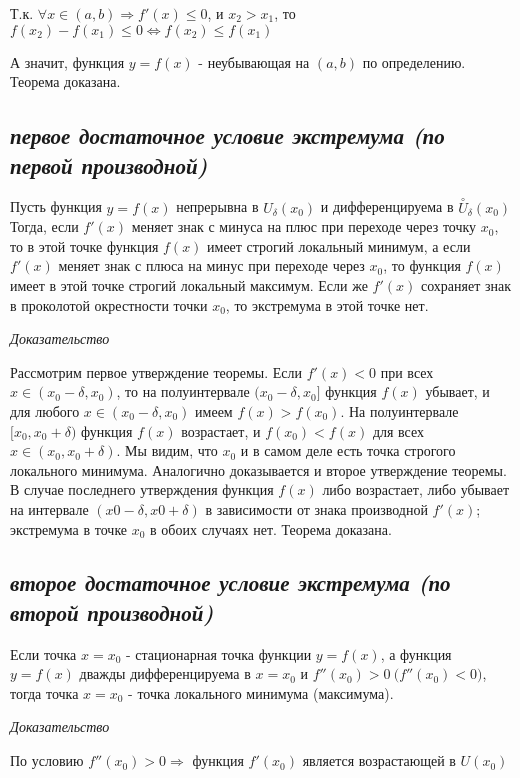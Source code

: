 Т.к. $\forall x \in (a, b) \Rightarrow f'(x) \leqslant 0$, и $x_2 > x_1$, то $f(x_2) - f(x_1) \leqslant 0 \iff f(x_2) \leqslant  f(x_1)$

А значит, функция $y = f(x)$ - неубывающая на $(a, b)$ по определению. Теорема доказана.
\subsection{\textit{первое достаточное условие экстремума (по первой производной)}}

Пусть функция $y = f(x)$ непрерывна в $U_\delta(x_0)$ и дифференцируема в $\overset{\circ}U_\delta(x_0)$ Тогда, если $f'(x)$ меняет знак с минуса на плюс при переходе через точку $x_0$, то в этой точке функция $f(x)$ имеет строгий локальный минимум, а если $f'(x)$ меняет знак с плюса на минус при переходе через $x_0$, то функция $f(x)$ имеет в этой точке строгий локальный максимум. Если же $f'(x)$ сохраняет знак в проколотой окрестности точки $x_0$, то экстремума в этой точке нет.

\textit{Доказательство}

Рассмотрим первое утверждение теоремы. Если $f'(x) < 0$ при всех $x \in (x_0 − \delta, x_0)$, то на полуинтервале $(x_0 − \delta, x_0]$ функция $f(x)$ убывает, и для любого $x \in (x_0 − \delta, x_0)$ имеем $f(x) > f(x_0)$. На полуинтервале $[x_0, x_0 + \delta)$ функция $f(x)$ возрастает, и $f(x_0) < f(x)$ для всех $x \in (x_0, x_0 + \delta)$. Мы видим, что $x_0$ и в самом деле есть точка строгого локального минимума. Аналогично доказывается и второе утверждение теоремы. В случае последнего утверждения функция $f(x)$ либо возрастает, либо убывает на интервале $(x0 − \delta, x0 + \delta)$ в зависимости от знака производной $f'(x)$; экстремума в точке $x_0$ в обоих случаях нет. Теорема доказана.
\subsection{\textit{второе достаточное условие экстремума (по второй производной)}}

Если точка $x = x_0$ - стационарная точка функции $y = f(x)$, а функция $y = f(x)$ дважды дифференцируема в $x = x_0$ и $f''(x_0) > 0 \ \big(f''(x_0) < 0\big)$, тогда точка $x = x_0 $ - точка локального минимума (максимума).

\textit{Доказательство}

По условию $f''(x_0)>0 \Rightarrow$ функция $f'(x_0)$ является возрастающей в $U(x_0)$

